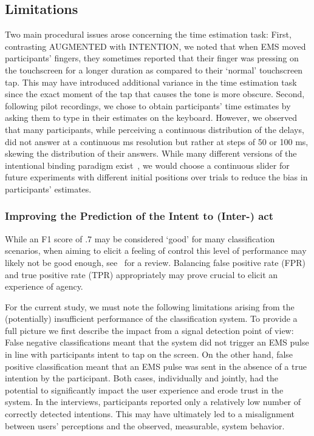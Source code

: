 \subsection{Limitations}
Two main procedural issues arose concerning the time estimation task: First, contrasting AUGMENTED with INTENTION, we noted that when EMS moved participants' fingers, they sometimes reported that their finger was pressing on the touchscreen for a longer duration as compared to their `normal' touchscreen tap. This may have introduced additional variance in the time estimation task since the exact moment of the tap that causes the tone is more obscure. Second, following pilot recordings, we chose to obtain participants' time estimates by asking them to type in their estimates on the keyboard. However, we observed that many participants, while perceiving a continuous distribution of the delays, did not answer at a continuous ms resolution but rather at steps of 50 or 100 ms, skewing the distribution of their answers. While many different versions of the intentional binding paradigm exist~\cite{Moore2012-dk}, we would choose a continuous slider for future experiments with different initial positions over trials to reduce the bias in participants' estimates.

\subsubsection{Improving the Prediction of the Intent to (Inter-) act}\label{improving_classifier}
While an F1 score of .7 may be considered `good' for many classification scenarios, when aiming to elicit a feeling of control this level of performance may likely not be good enough, see~\citet{Papenmeier2022-oi} for a review. Balancing false positive rate (FPR) and true positive rate (TPR) appropriately may prove crucial to elicit an experience of agency.

For the current study, we must note the following limitations arising from the (potentially) insufficient performance of the classification system. To provide a full picture we first describe the impact from a signal detection point of view: False negative classifications meant that the system did not trigger an EMS pulse in line with participants intent to tap on the screen. On the other hand, false positive classification meant that an EMS pulse was sent in the absence of a true intention by the participant. Both cases, individually and jointly, had the potential to significantly impact the user experience and erode trust in the system. In the interviews, participants reported only a relatively low number of correctly detected intentions. This may have ultimately led to a misalignment between users' perceptions and the observed, measurable, system behavior. 

